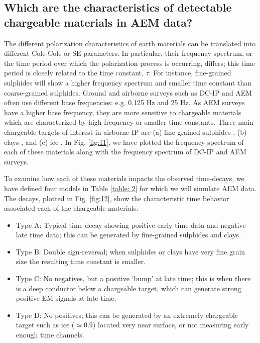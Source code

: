 \documentclass[manuscript]{geophysics}
\begin{document}
\subsection{Which are the characteristics of  detectable chargeable materials in AEM data?}
The different polarization characteristics of earth materials can be translated into different Cole-Cole or SE parameters. In particular, their frequency spectrum, or the time period over which the polarization process is occurring, differs; this time period is closely related to the time constant, $\tau$. For instance, fine-grained sulphides will show a higher frequency spectrum and smaller time constant than coarse-grained sulphides. Ground and airborne surveys such as DC-IP and AEM often use different base frequencies: e.g. 0.125 Hz and 25 Hz. As AEM surveys have a higher base frequency, they are more sensitive to chargeable materials which are characterized by high frequency or smaller time constants. Three main chargeable targets of interest in airborne IP are (a) fine-grained sulphides \cite[]{pelton1978,Revil2017}, (b) clays \cite[]{macnae2016,leroy2009}, and (c) ice \cite[]{grimm2015,kang2017}. In Fig. \ref{fig:11}, we have plotted the frequency spectrum of each of these materials along with the frequency spectrum of DC-IP and AEM surveys.

To examine how each of these materials impacts the observed time-decays, we have defined four models in Table \ref{table: 2} for which we will simulate AEM data. The decays, plotted in Fig. \ref{fig:12}, show the characteristic time behavior associated each of the chargeable materials:

\begin{itemize}
    \item Type A: Typical time decay showing positive early time data and negative late time data; this can be generated by fine-grained sulphides and clays.
    \item Type B: Double sign-reversal; when sulphides or clays have very fine grain size the resulting time constant is smaller.
    \item Type C: No negatives, but a positive `bump' at late time; this is when there is a deep conductor below a chargeable target, which can generate strong positive EM signals at late time.
    \item Type D: No positives; this can be generated by an extremely chargeable target such as ice ($\simeq$0.9) located very near surface, or not measuring early enough time channels.
\end{itemize}
\end{document}
